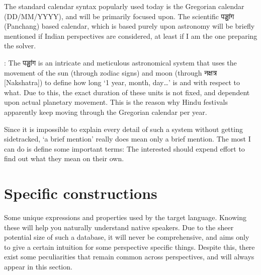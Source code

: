 The standard calendar syntax popularly used today is the Gregorian calendar  (DD/MM/YYYY), and will be primarily focused upon. The  scientific \textsanskrit{पञ्चांग} (Panchang) based calendar, which is based purely upon astronomy will be briefly mentioned if Indian perspectives are considered, at least if I am the one preparing the solver.

\textcolor{purple}{}: The \textsanskrit{पञ्चांग} is an intricate and meticulous astronomical system that uses the movement of the sun (through zodiac signs) and moon (through \textsanskrit{नक्षत्र} [Nakshatra]) to define how long `1 year, month, day\ldots'  is and with respect to what. Due to this, the exact duration of these units is not fixed, and dependent upon  actual  planetary movement. This is the reason why Hindu festivals apparently keep moving through the Gregorian calendar per year. 

Since it is impossible to explain every detail of such a system without getting sidetracked, `a brief mention' really does mean only a brief mention. The most I can do is define some important terms: The interested should expend effort to find out what they mean on their own.
\section{Specific constructions} \label{sec:enspco}
Some unique expressions and properties used by the target language. Knowing these will help you naturally understand native speakers. Due to the sheer potential size of such a database, it will never be comprehensive, and aims only to give a certain intuition for some perspective specific things. Despite this, there exist some peculiarities that remain common across perspectives, and will always appear in this section.
